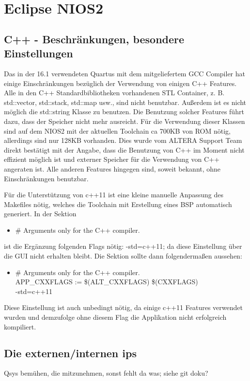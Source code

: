 \chapter{Eclipse NIOS2}
\section{C++ - Beschränkungen, besondere Einstellungen}
Das in der 16.1 verwendeten Quartus mit dem mitgeliefertem GCC Compiler hat einige Einschränkungen bezüglich der Verwendung von einigen C++ Features. Alle in den C++ Standardbibliotheken vorhandenen STL Container, z. B. std::vector, std::stack, std::map usw., sind nicht benutzbar. Außerdem ist es nicht möglich die std::string Klasse zu benutzen. Die Benutzung solcher Features führt dazu, dass der Speicher nicht mehr ausreicht. Für die Verwendung dieser Klassen sind auf dem NIOS2 mit der aktuellen Toolchain ca 700KB von ROM nötig, allerdings sind nur 128KB vorhanden. Dies wurde vom ALTERA Support Team direkt bestätigt mit der Angabe, dass die Benutzung von C++ im Moment nicht effizient möglich ist und externer Speicher für die Verwendung von C++ angeraten ist. Alle anderen Features hingegen sind, soweit bekannt, ohne Einschränkungen benutzbar.

Für die Unterstützung von c++11 ist eine kleine manuelle Anpassung des Makefiles nötig, welches die Toolchain mit Erstellung eines BSP automatisch generiert. In der Sektion
\begin{itemize}
 \item \# Arguments only for the C++ compiler.
\end{itemize}
ist die Ergänzung folgenden Flags nötig: -std=c++11; da diese Einstellung über die GUI nicht erhalten bleibt. Die Sektion sollte dann folgendermaßen aussehen:
\begin{itemize}
 \item \# Arguments only for the C++ compiler.\\APP\_CXXFLAGS := \$(ALT\_CXXFLAGS) \$(CXXFLAGS) \ \\-std=c++11
\end{itemize}
Diese Einstellung ist auch unbedingt nötig, da einige c++11 Features verwendet wurden und demzufolge ohne diesem Flag die Applikation nicht erfolgreich kompiliert.

\section{Die externen/internen ips}
Qsys bemühen, die mitzunehmen, sonst fehlt da was; siehe git doku?

